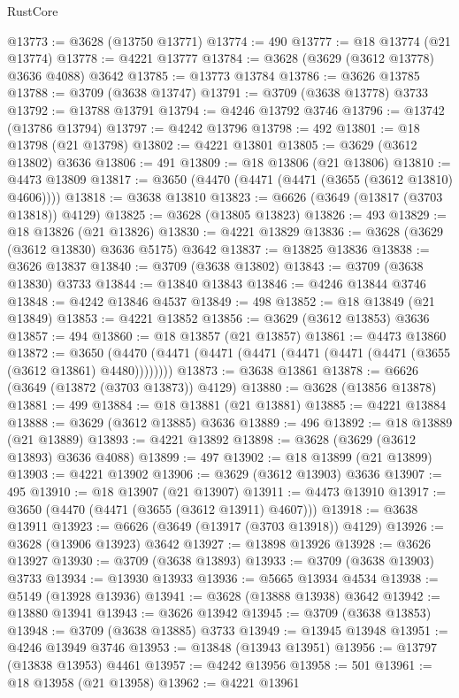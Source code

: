 \begin{lexlean}{RustCore}
\begin{coremodule}
@13773 := @3628 (@13750 @13771)
@13774 := 490
@13777 := @18 @13774 (@21 @13774)
@13778 := @4221 @13777
@13784 := @3628 (@3629 (@3612 @13778) @3636 @4088) @3642
@13785 := @13773 @13784
@13786 := @3626 @13785
@13788 := @3709 (@3638 @13747)
@13791 := @3709 (@3638 @13778) @3733
@13792 := @13788 @13791
@13794 := @4246 @13792 @3746
@13796 := @13742 (@13786 @13794)
@13797 := @4242 @13796
@13798 := 492
@13801 := @18 @13798 (@21 @13798)
@13802 := @4221 @13801
@13805 := @3629 (@3612 @13802) @3636
@13806 := 491
@13809 := @18 @13806 (@21 @13806)
@13810 := @4473 @13809
@13817 := @3650 (@4470 (@4471 (@4471 (@3655 (@3612 @13810) @4606))))
@13818 := @3638 @13810
@13823 := @6626 (@3649 (@13817 (@3703 @13818)) @4129)
@13825 := @3628 (@13805 @13823)
@13826 := 493
@13829 := @18 @13826 (@21 @13826)
@13830 := @4221 @13829
@13836 := @3628 (@3629 (@3612 @13830) @3636 @5175) @3642
@13837 := @13825 @13836
@13838 := @3626 @13837
@13840 := @3709 (@3638 @13802)
@13843 := @3709 (@3638 @13830) @3733
@13844 := @13840 @13843
@13846 := @4246 @13844 @3746
@13848 := @4242 @13846 @4537
@13849 := 498
@13852 := @18 @13849 (@21 @13849)
@13853 := @4221 @13852
@13856 := @3629 (@3612 @13853) @3636
@13857 := 494
@13860 := @18 @13857 (@21 @13857)
@13861 := @4473 @13860
@13872 := @3650 (@4470 (@4471 (@4471 (@4471 (@4471 (@4471 (@4471 (@3655 (@3612 @13861) @4480))))))))
@13873 := @3638 @13861
@13878 := @6626 (@3649 (@13872 (@3703 @13873)) @4129)
@13880 := @3628 (@13856 @13878)
@13881 := 499
@13884 := @18 @13881 (@21 @13881)
@13885 := @4221 @13884
@13888 := @3629 (@3612 @13885) @3636
@13889 := 496
@13892 := @18 @13889 (@21 @13889)
@13893 := @4221 @13892
@13898 := @3628 (@3629 (@3612 @13893) @3636 @4088)
@13899 := 497
@13902 := @18 @13899 (@21 @13899)
@13903 := @4221 @13902
@13906 := @3629 (@3612 @13903) @3636
@13907 := 495
@13910 := @18 @13907 (@21 @13907)
@13911 := @4473 @13910
@13917 := @3650 (@4470 (@4471 (@3655 (@3612 @13911) @4607)))
@13918 := @3638 @13911
@13923 := @6626 (@3649 (@13917 (@3703 @13918)) @4129)
@13926 := @3628 (@13906 @13923) @3642
@13927 := @13898 @13926
@13928 := @3626 @13927
@13930 := @3709 (@3638 @13893)
@13933 := @3709 (@3638 @13903) @3733
@13934 := @13930 @13933
@13936 := @5665 @13934 @4534
@13938 := @5149 (@13928 @13936)
@13941 := @3628 (@13888 @13938) @3642
@13942 := @13880 @13941
@13943 := @3626 @13942
@13945 := @3709 (@3638 @13853)
@13948 := @3709 (@3638 @13885) @3733
@13949 := @13945 @13948
@13951 := @4246 @13949 @3746
@13953 := @13848 (@13943 @13951)
@13956 := @13797 (@13838 @13953) @4461
@13957 := @4242 @13956
@13958 := 501
@13961 := @18 @13958 (@21 @13958)
@13962 := @4221 @13961

\end{coremodule}
\end{lexlean}
